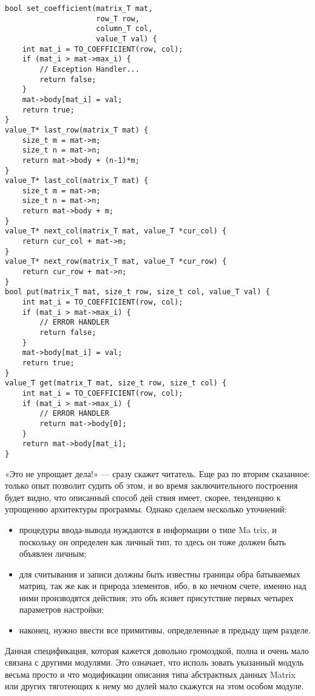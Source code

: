 \documentclass{../../template/mai_book}
\begin{document}
\begin{lstlisting}
bool set_coefficient(matrix_T mat,
                     row_T row,
                     column_T col,
                     value_T val) {
    int mat_i = TO_COEFFICIENT(row, col);
    if (mat_i > mat->max_i) {
        // Exception Handler...
        return false;
    }
    mat->body[mat_i] = val;
    return true;
}
value_T* last_row(matrix_T mat) {
    size_t m = mat->m;
    size_t n = mat->n;
    return mat->body + (n-1)*m;
}
value_T* last_col(matrix_T mat) {
    size_t m = mat->m;
    size_t n = mat->n;
    return mat->body + m;
}
value_T* next_col(matrix_T mat, value_T *cur_col) {
    return cur_col + mat->m;
}
value_T* next_row(matrix_T mat, value_T *cur_row) {
    return cur_row + mat->n;
}
bool put(matrix_T mat, size_t row, size_t col, value_T val) {
    int mat_i = TO_COEFFICIENT(row, col);
    if (mat_i > mat->max_i) {
        // ERROR HANDLER
        return false;
    }
    mat->body[mat_i] = val;
    return true;
}
value_T get(matrix_T mat, size_t row, size_t col) {
    int mat_i = TO_COEFFICIENT(row, col);
    if (mat_i > mat->max_i) {
        // ERROR HANDLER
        return mat->body[0];
    }
    return mat->body[mat_i];
}
\end{lstlisting}
«Это не упрощает дела!» — сразу скажет читатель. Еще раз по­
вторим сказанное: только опыт позволит судить об этом, и во время
заключительного построения будет видно, что описанный способ дей­
ствия имеет, скорее, тенденцию к упрощению архитектуры программы.
Однако сделаем несколько уточнений:
\begin{itemize}
\item процедуры ввода-вывода нуждаются в информации о типе Ma­
trix, и поскольку он определен как личный тип, то здесь он тоже
должен быть объявлен личным;
\item для считывания и записи должны быть известны границы обра­
батываемых матриц, так же как и природа элементов, ибо, в ко­
нечном счете, именно над ними производятся действия; это объ­
ясняет присутствие первых четырех параметров настройки;
\item наконец, нужно ввести все примитивы, определенные в предыду­
щем разделе.
\end{itemize}

Данная спецификация, которая кажется довольно громоздкой, полна
и очень мало связана с другими модулями. Это означает, что исполь­
зовать указанный модуль весьма просто и что модификации описания
типа абстрактных данных Matrix или других тяготеющих к нему мо­
дулей мало скажутся на этом особом модуле.
\end{document}
